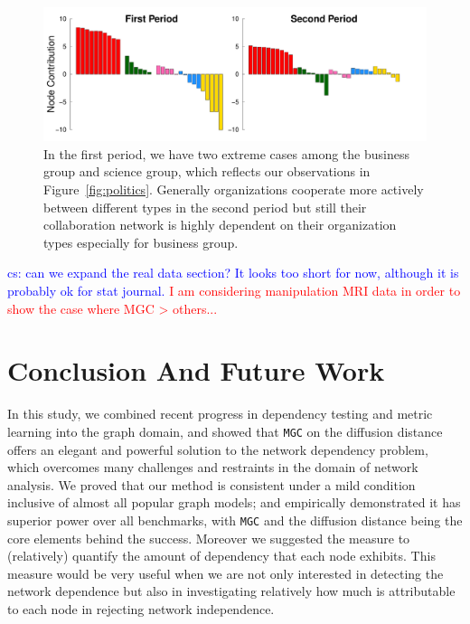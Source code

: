 \documentclass[11pt]{article}
\theoremstyle{definition}
\newcommand{\cs}[1]{\textcolor{blue}{cs: #1}}
\begin{document}
\begin{figure}[ht]
	\centering
	\includegraphics[width=\linewidth]{barplots_nolegend.pdf}	
	\caption{In the first period, we have two extreme cases among the business group and science group, which reflects our observations in Figure~\ref{fig:politics}. Generally organizations cooperate more actively between different types in the second period but still their collaboration network is highly dependent on their organization types especially for business group.}
	\label{fig:barplots}
\end{figure}
\cs{can we expand the real data section? It looks too short for now, although it is probably ok for stat journal.}
\textcolor{red}{I am considering manipulation MRI data in order to show the case where MGC > others... }

\vspace*{-0.5cm}
\section{Conclusion And Future Work}
\label{sec:conc}
	\vspace*{-0.2cm}
In this study, we combined recent progress in dependency testing and metric learning into the graph domain, and showed that \texttt{MGC} on the diffusion distance offers an elegant and powerful solution to the network dependency problem, which overcomes many challenges and restraints in the domain of network analysis. We proved that our method is consistent under a mild condition inclusive of almost all popular graph models; and empirically demonstrated it has superior power over all benchmarks, with \texttt{MGC} and the diffusion distance being the core elements behind the success. Moreover we suggested the measure to (relatively) quantify the amount of dependency that each node exhibits. This measure would be very useful when we are not only interested in detecting the network dependence but also in investigating relatively how much is attributable to each node in rejecting network independence.  
\end{document}
